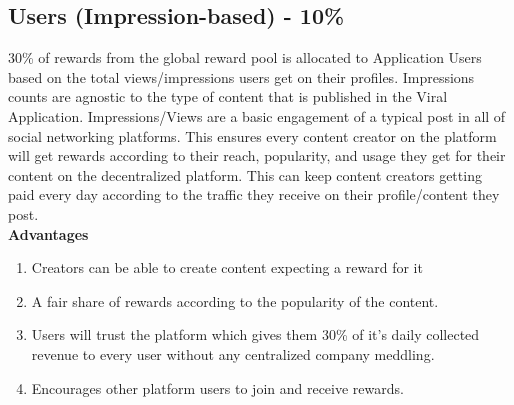 \documentclass[10pt]{article}
\begin{document}

\subsection{Users (Impression-based) - 10\%}

30\% of rewards from the global reward pool is allocated to Application Users based on the total views/impressions users get on their profiles. Impressions counts are agnostic to the type of content that is published in the Viral Application. Impressions/Views are a basic engagement of a typical post in all of social networking platforms. This ensures every content creator on the platform will get rewards according to their reach, popularity, and usage they get for their content on the decentralized platform. This can keep content creators getting paid every day according to the traffic they receive on their profile/content they post.\\

\textbf{Advantages}\\

\begin{enumerate}[leftmargin=+0.2in]
\item Creators can be able to create content expecting a reward for it
\item A fair share of rewards according to the popularity of the content.
\item Users will trust the platform which gives them 30\% of it’s daily collected revenue to every user without any centralized company meddling.
\item Encourages other platform users to join and receive rewards.
\end{enumerate}
\end{document}

